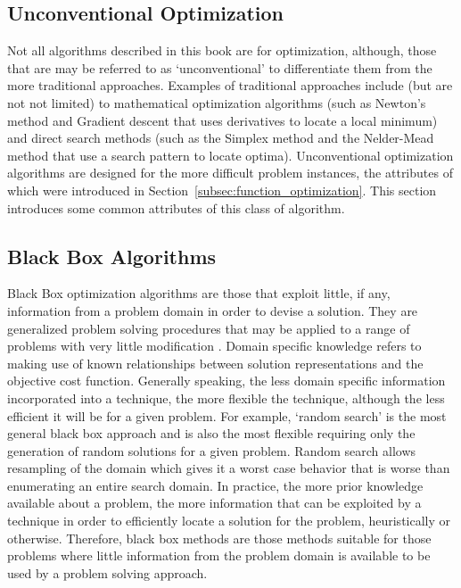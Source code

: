\begin{bibunit}
% 
% 
\section{Unconventional Optimization}
\label{sec:unconventional_optimization}
Not all algorithms described in this book are for optimization, although, those that are may be referred to as `unconventional' to differentiate them from the more traditional approaches. Examples of traditional approaches include (but are not not limited) to mathematical optimization algorithms (such as Newton's method and Gradient descent that uses derivatives to locate a local minimum) and direct search methods (such as the Simplex method and the Nelder-Mead method that use a search pattern to locate optima).
Unconventional optimization algorithms are designed for the more difficult problem instances, the attributes of which were introduced in Section~\ref{subsec:function_optimization}. This section introduces some common attributes of this class of algorithm.

% 
% 
\subsection{Black Box Algorithms}
\label{subsec:black_box}
Black Box optimization algorithms are those that exploit little, if any, information from a problem domain in order to devise a solution. They are generalized problem solving procedures that may be applied to a range of problems with very little modification \cite{Droste2006}.
Domain specific knowledge refers to making use of known relationships between solution representations and the objective cost function. Generally speaking, the less domain specific information incorporated into a technique, the more flexible the technique, although the less efficient it will be for a given problem. For example, `random search' is the most general black box approach and is also the most flexible requiring only the generation of random solutions for a given problem. Random search allows resampling of the domain which gives it a worst case behavior that is worse than enumerating an entire search domain. In practice, the more prior knowledge available about a problem, the more information that can be exploited by a technique in order to efficiently locate a solution for the problem, heuristically or otherwise. Therefore, black box methods are those methods suitable for those problems where little information from the problem domain is available to be used by a problem solving approach.  


\end{bibunit}
